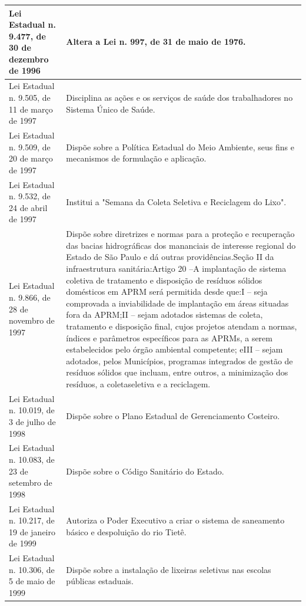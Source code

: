 \begin{center}
\begin{longtable}{|p{}|p{}|}
			\hline
			Lei Estadual n. 9.477, de 30 de dezembro de 1996 & Altera a Lei n. 997, de 31 de maio de 1976. \\
			\hline
			Lei Estadual n. 9.505, de 11 de março de 1997 & Disciplina as ações e os serviços de saúde dos trabalhadores no Sistema Único de Saúde. \\
			\hline
			Lei Estadual n. 9.509, de 20 de março de 1997 & Dispõe sobre a Política Estadual do Meio Ambiente, seus fins e mecanismos de formulação e aplicação. \\
			\hline
			Lei Estadual n. 9.532, de 24 de abril de 1997 & Institui a "Semana da Coleta Seletiva e Reciclagem do Lixo". \\
			\hline
			Lei Estadual n. 9.866, de 28 de novembro de 1997 & Dispõe  sobre  diretrizes  e  normas  para  a  proteção  e  recuperação  das  bacias hidrográficas dos mananciais de interesse regional do Estado de São Paulo e dá outras providências.\newline{}Seção II da infraestrutura sanitária:\newline{}Artigo  20  –A  implantação  de  sistema  coletiva  de  tratamento  e  disposição  de resíduos sólidos domésticos em APRM será permitida desde que:\newline{}I – seja comprovada a inviabilidade de implantação em áreas situadas fora da APRM;\newline{}II  –  sejam  adotados  sistemas  de  coleta,  tratamento  e  disposição  final,  cujos projetos atendam a normas, índices e parâmetros específicos para as APRMs, a serem estabelecidos pelo órgão ambiental competente; e\newline{}III  –  sejam  adotados,  pelos  Municípios,  programas  integrados  de  gestão  de resíduos sólidos que incluam, entre outros, a minimização dos resíduos, a coleta\newline{}seletiva e a reciclagem. \\
			\hline
			Lei Estadual n. 10.019, de 3 de julho de 1998 & Dispõe sobre o Plano Estadual de Gerenciamento Costeiro. \\
			\hline
			Lei  Estadual  n.  10.083,  de  23 de setembro de 1998 & Dispõe sobre o Código Sanitário do Estado. \\
			\hline
			Lei  Estadual  n.  10.217,  de  19 de janeiro de 1999 & Autoriza   o   Poder   Executivo   a   criar   o   sistema   de   saneamento   básico   e despoluição do rio Tietê. \\
			\hline
			Lei Estadual n. 10.306, de 5 de maio de 1999 & Dispõe sobre a instalação de lixeiras seletivas nas escolas públicas estaduais. \\

\end{longtable}
\end{center}
